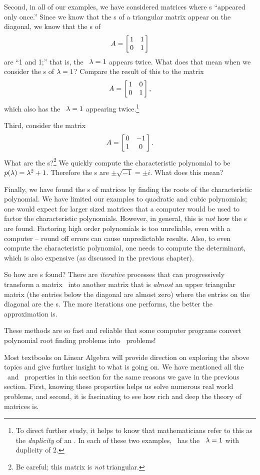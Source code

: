 Second, in all of our examples, we have considered matrices where \el s ``appeared only once.'' Since we know that the \el s of a triangular matrix appear on the diagonal, we know that the \el s of $$\tta = \bmx{cc}1&1\\0&1\emx$$ are ``1 and 1;'' that is, the \el\ $\lda = 1$ appears twice. What does that mean when we consider the \ev s of $\lda = 1$? Compare the result of this to the matrix $$\tta = \bmx{cc}1&0\\0&1\emx,$$ which also has the \el\ $\lda =1$ appearing twice.\footnote{To direct further study, it helps to know that mathematicians refer to this as the \textit{duplicity} of an \el. In each of these two examples, \tta\ has the \el\ $\lda=1$ with duplicity of 2.}

Third, consider the matrix $$\tta = \bmx{cc}0&-1\\1&0\emx.$$ What are the \el s?\footnote{Be careful; this matrix is \textit{not} triangular.} We quickly compute the characteristic polynomial to be $p(\lda) = \lda^2 + 1$. Therefore the \el s are $\pm \sqrt{-1} = \pm i$. What does this mean?

Finally, we have found the \el s of matrices by finding the roots of the characteristic polynomial. We have limited our examples to quadratic and cubic polynomials; one would expect for larger sized matrices that a computer would be used to factor the characteristic polynomials. However, in general, this is \textit{not} how the \el s are found. Factoring high order polynomials is too unreliable, even with a computer -- round off errors can cause unpredictable results. Also, to even compute the characteristic polynomial, one needs to compute the determinant, which is also expensive (as discussed in the previous chapter). 

So how are \el s found? There are \textit{iterative} processes that can progressively transform a matrix \tta\ into another matrix that is \textit{almost} an upper triangular matrix (the entries below the diagonal are almost zero) where the entries on the diagonal are the \el s. The more iterations one performs, the better the approximation is. 

These methods are so fast and reliable that some computer programs convert polynomial root finding problems into \el\ problems!

Most textbooks on Linear Algebra will provide direction on exploring the above topics and give further insight to what is going on. We have mentioned all the \el\ and \ev\ properties in this section for the same reasons we gave in the previous section. First, knowing these properties helps us solve numerous real world problems, and second, it is fascinating to see how rich and deep the theory of matrices is.\\

\clearpage

